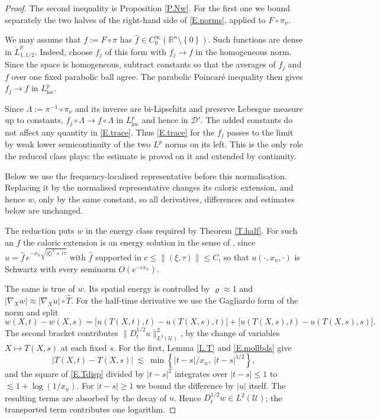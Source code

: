 \documentclass[12pt,leqno]{amsart}
\numberwithin{equation}{section}
\DeclareMathOperator{\loc}{loc}
\newcommand{\R}{\mathbb R}
\newcommand{\wh}{\widehat}
\newcommand{\abs}[1]{\left\vert#1\right\vert}
\newcommand{\br}[1]{\left(#1\right)}
\newcommand{\set}[1]{\left\{#1\right\}}
\newcommand{\dhalf}{D_t^{1/2}}
\newcommand{\Uc}{\mathcal U}
\theoremstyle{plain}
\theoremstyle{remark}
\begin{document}
\begin{proof}
The second inequality is Proposition \ref{P.Nw}. For the first one we bound
separately the two halves of the right-hand side of \eqref{E.norms}, applied to
$F\circ\pi_\nu$.

\noindent We may assume that $f:=F\circ\pi$ has
$\wh f\in C^\infty_0(\R^n\setminus\set0)$. Such functions are dense in
$\dot L^p_{1,1/2}$. Indeed, choose $f_j$ of this form with
$f_j\to f$ in the homogeneous norm. Since the space is homogeneous, subtract
constants so that the averages of $f_j$ and $f$ over one fixed parabolic ball
agree. The parabolic Poincar\'e inequality then gives
$f_j\to f$ in $L^p_{\loc}$.

Since
$\Lambda:=\pi^{-1}\circ\pi_\nu$ and its inverse are bi-Lipschitz and preserve
Lebesgue measure up to constants, $f_j\circ\Lambda\to f\circ\Lambda$ in
$L^p_{\loc}$ and hence in $\mathcal D'$. The added constants do not affect any
quantity in \eqref{E.trace}. Thus \eqref{E.trace} for the $f_j$ passes to the
limit by weak lower semicontinuity of the two $L^p$ norms on its left. This is
the only role the reduced class plays: the estimate is proved on it and
extended by continuity.\medskip

\noindent Below we use the frequency-localised representative before this
normalisation. Replacing it by the normalised representative changes its
caloric extension, and hence $w$, only by the same constant, so all derivatives,
differences and estimates below are unchanged.

\noindent The reduction puts $w$ in the energy class required by Theorem
\ref{T.half}. For such an $f$ the caloric
extension is an energy solution in the sense of \cite[\S2]{DLPN}, since
$\wh u=\wh f\,e^{-x_n\sqrt{\abs\xi^2+i\tau}}$ with $\wh f$ supported in
$c\le\|(\xi,\tau)\|\le C$, so that $u(\cdot,x_n,\cdot)$ is Schwartz with every
seminorm $O(e^{-cx_n})$.

\noindent The same is true of $w$. Its spatial energy is controlled by
$\varrho\approx1$ and
$\abs{\nabla_Xw}\approx\abs{\nabla_Xu}\circ\widehat T$.
For the half-time derivative we use the Gagliardo form of the norm and split
$$w(X,t)-w(X,s)=\Big[u\br{T(X,t),t}-u\br{T(X,s),t}\Big]
  +\Big[u\br{T(X,s),t}-u\br{T(X,s),s}\Big] .$$
The second bracket contributes $\|\dhalf u\|^2_{L^2(\Uc)}$, by the change of
variables $X\mapsto T(X,s)$ at each fixed $s$. For the first, Lemma \ref{L.T}
and \eqref{E.mollbds} give
\begin{equation}\label{E.Tdisp}
  \abs{T(X,t)-T(X,s)}\ \lesssim\
  \min\set{\abs{t-s}/x_n,\ \abs{t-s}^{1/2}} ,
\end{equation}
and the square of \eqref{E.Tdisp} divided by $\abs{t-s}^2$ integrates over
$\abs{t-s}\le1$ to $\lesssim1+\log(1/x_n)$. For $\abs{t-s}\ge1$ we bound the
difference by $\abs u$ itself. The resulting terms are absorbed by the decay
of $u$. Hence $\dhalf w\in L^2(\Uc)$; the transported term contributes one
logarithm.\medskip


\end{proof}
\end{document}
